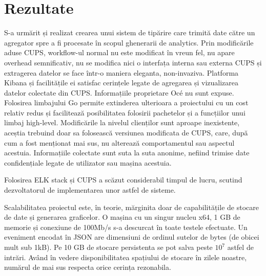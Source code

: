 \documentclass[12pt]{report}
\begin{document}
{\chapter{Rezultate}
S-a urmărit și realizat crearea unui sistem de tipărire care trimită date către un agregator spre a fi procesate în scopul ghenerarii de analytics. Prin modificările aduse CUPS, workflow-ul normal nu este modificat în vreun fel, nu apare overhead semnificativ, nu se modifica nici o interfața interna sau externa CUPS și extragerea datelor se face într-o maniera eleganta, non-invaziva. Platforma Kibana și facilitățile ei satisfac cerințele legate de agregarea și vizualizarea datelor colectate din CUPS. Informațiile proprietare Océ nu sunt expuse. Folosirea limbajului Go permite extinderea ulterioara a proiectului cu un cost relativ redus și facilitează posibilitatea folosirii pachetelor și a funcțiilor unui limbaj high-level. Modificările la nivelul clienților sunt aproape inexistente, aceștia trebuind doar sa folosească versiunea modificata de CUPS, care, după cum a fost menționat mai sus, nu alterează comportamentul sau aspectul acestuia. Informațiile colectate sunt suta la suta anonime, nefiind trimise date confidențiale legate de utilizator sau mașina acestuia.

Folosirea ELK stack și CUPS a scăzut considerabil timpul de lucru, scutind dezvoltatorul de implementarea unor astfel de sisteme.

Scalabilitatea proiectul este, în teorie, mărginita doar de capabilitățile de stocare de date și generarea graficelor. O mașina cu un singur nucleu x64, 1 GB de memorie și conexiune de 100Mb/s s-a descurcat în toate testele efectuate. Un eveniment encodat în JSON are dimensiuni de ordinul sutelor de bytes (de obicei mult sub 1kB). Pe 10 GB de stocare persistenta se pot salva peste \begin{math} 10^7 \end{math} astfel de intrări. Având în vedere disponibilitatea spațiului de stocare în zilele noastre, numărul de mai sus respecta orice cerința rezonabila. 

}
\end{document}
